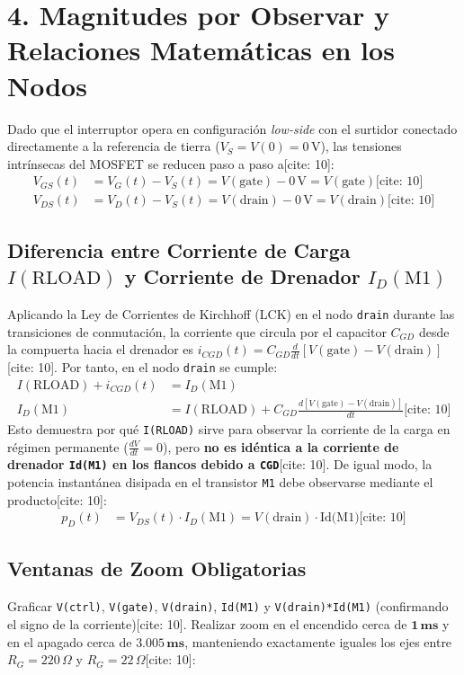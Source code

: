 \documentclass[11pt, a4paper]{article}
\begin{document}
\section*{4. Magnitudes por Observar y Relaciones Matemáticas en los Nodos}
Dado que el interruptor opera en configuración \textit{low-side} con el surtidor conectado directamente a la referencia de tierra ($V_S = V(0) = 0\,\text{V}$), las tensiones intrínsecas del MOSFET se reducen paso a paso a[cite: 10]:
\begin{align}
    V_{GS}(t) &= V_G(t) - V_S(t) = V(\text{gate}) - 0\,\text{V} = V(\text{gate}) \text{[cite: 10]} \\
    V_{DS}(t) &= V_D(t) - V_S(t) = V(\text{drain}) - 0\,\text{V} = V(\text{drain}) \text{[cite: 10]}
\end{align}

\subsection*{Diferencia entre Corriente de Carga $I(\text{RLOAD})$ y Corriente de Drenador $I_D(\text{M1})$}
Aplicando la Ley de Corrientes de Kirchhoff (LCK) en el nodo \texttt{drain} durante las transiciones de conmutación, la corriente que circula por el capacitor $C_{GD}$ desde la compuerta hacia el drenador es $i_{CGD}(t) = C_{GD}\frac{d}{dt}\left[V(\text{gate}) - V(\text{drain})\right]$[cite: 10]. Por tanto, en el nodo \texttt{drain} se cumple:
\begin{align}
    I(\text{RLOAD}) + i_{CGD}(t) &= I_D(\text{M1}) \\
    I_D(\text{M1}) &= I(\text{RLOAD}) + C_{GD}\frac{d\left[V(\text{gate}) - V(\text{drain})\right]}{dt} \text{[cite: 10]}
\end{align}
Esto demuestra por qué \texttt{I(RLOAD)} sirve para observar la corriente de la carga en régimen permanente ($\frac{dV}{dt} = 0$), pero \textbf{no es idéntica a la corriente de drenador \texttt{Id(M1)} en los flancos debido a \texttt{CGD}}[cite: 10]. De igual modo, la potencia instantánea disipada en el transistor \texttt{M1} debe observarse mediante el producto[cite: 10]:
\begin{align}
    p_D(t) &= V_{DS}(t) \cdot I_D(\text{M1}) = V(\text{drain}) \cdot \text{Id(M1)} \text{[cite: 10]}
\end{align}

\subsection*{Ventanas de Zoom Obligatorias}
Graficar \texttt{V(ctrl)}, \texttt{V(gate)}, \texttt{V(drain)}, \texttt{Id(M1)} y \texttt{V(drain)*Id(M1)} (confirmando el signo de la corriente)[cite: 10]. Realizar zoom en el encendido cerca de $\mathbf{1\,\text{ms}}$ y en el apagado cerca de $\mathbf{3.005\,\text{ms}}$, manteniendo exactamente iguales los ejes entre $R_G = 220\,\Omega$ y $R_G = 22\,\Omega$[cite: 10]:
\end{document}
